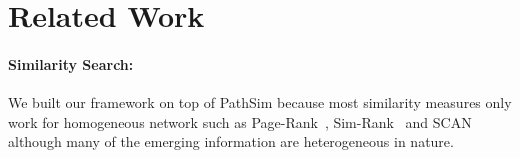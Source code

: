 \section{Related Work}
\label{sec:rel-work}

\paragraph{Similarity Search:} We built our framework on top of PathSim because
most similarity measures only work for homogeneous network such
as Page-Rank~\cite{page1999pagerank}, Sim-Rank~\cite{jeh2002simrank}
and SCAN~\cite{xu2007scan} although many of the emerging information are
heterogeneous in nature.
